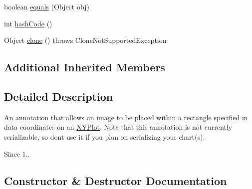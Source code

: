 \begin{DoxyCompactItemize}
\item 
boolean \mbox{\hyperlink{classorg_1_1jfree_1_1chart_1_1annotations_1_1_x_y_data_image_annotation_aea762fe5f4e2247f218b759198e63871}{equals}} (Object obj)
\item 
int \mbox{\hyperlink{classorg_1_1jfree_1_1chart_1_1annotations_1_1_x_y_data_image_annotation_a96bbbed6ae06f857b828d7b200facf56}{hash\+Code}} ()
\item 
Object \mbox{\hyperlink{classorg_1_1jfree_1_1chart_1_1annotations_1_1_x_y_data_image_annotation_a7650cee59521248c3e9b7ceb7ef28dd5}{clone}} ()  throws Clone\+Not\+Supported\+Exception 
\end{DoxyCompactItemize}
\subsection*{Additional Inherited Members}


\subsection{Detailed Description}
An annotation that allows an image to be placed within a rectangle specified in data coordinates on an \mbox{\hyperlink{}{X\+Y\+Plot}}. Note that this annotation is not currently serializable, so don\textquotesingle{}t use it if you plan on serializing your chart(s).

\begin{DoxySince}{Since}
1.. 
\end{DoxySince}


\subsection{Constructor \& Destructor Documentation}
\mbox{\label{classorg_1_1jfree_1_1chart_1_1annotations_1_1_x_y_data_image_annotation_a54591684e629daa473298807355a4b08}} 
